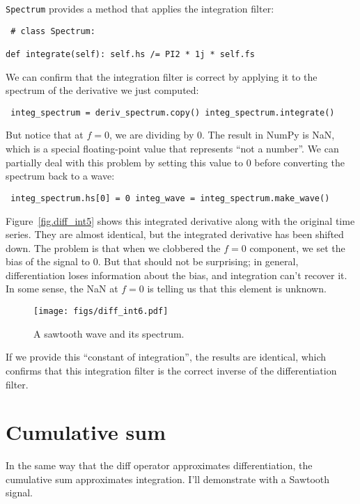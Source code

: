 \documentclass[12pt]{book} \usepackage[width=5.5in,height=8.5in, hmarginratio=3:2,vmarginratio=1:1]{geometry}
\begin{document}
{\tt Spectrum} provides a method that applies the integration filter: 

\begin{verbatim} # class Spectrum: 

def integrate(self): self.hs /= PI2 * 1j * self.fs \end{verbatim} 

We can confirm that the integration filter is correct by applying it to the spectrum of the derivative we just computed: 

\begin{verbatim} integ_spectrum = deriv_spectrum.copy() integ_spectrum.integrate() \end{verbatim} 

But notice that at $f=0$, we are dividing by 0. The result in NumPy is NaN, which is a special floating-point value that represents ``not a number''. We can partially deal with this problem by setting this value to 0 before converting the spectrum back to a wave: 

\begin{verbatim} integ_spectrum.hs[0] = 0 integ_wave = integ_spectrum.make_wave() \end{verbatim} 

Figure~\ref{fig.diff_int5} shows this integrated derivative along with the original time series. They are almost identical, but the integrated derivative has been shifted down. The problem is that when we clobbered the $f=0$ component, we set the bias of the signal to 0. But that should not be surprising; in general, differentiation loses information about the bias, and integration can't recover it. In some sense, the NaN at $f=0$ is telling us that this element is unknown. 

\begin{figure} 

\centerline{\texttt{[image: figs/diff\_int6.pdf]}} \caption{A sawtooth wave and its spectrum.} \label{fig.diff_int6} \end{figure} 

If we provide this ``constant of integration'', the results are identical, which confirms that this integration filter is the correct inverse of the differentiation filter. 

\section{Cumulative sum} \label{cumsum} 

In the same way that the diff operator approximates differentiation, the cumulative sum approximates integration. I'll demonstrate with a Sawtooth signal. 
\end{document}
